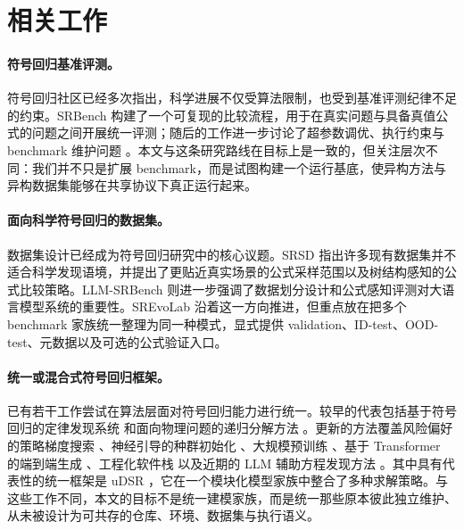 \documentclass[UTF8]{ctexart}
\begin{document}
\section{相关工作}

\paragraph{符号回归基准评测。}
符号回归社区已经多次指出，科学进展不仅受算法限制，也受到基准评测纪律不足的约束。SRBench \citep{lacava2021srbench} 构建了一个可复现的比较流程，用于在真实问题与具备真值公式的问题之间开展统一评测；随后的工作进一步讨论了超参数调优、执行约束与 benchmark 维护问题 \citep{aldeia2025call}。本文与这条研究路线在目标上是一致的，但关注层次不同：我们并不只是扩展 benchmark，而是试图构建一个运行基底，使异构方法与异构数据集能够在共享协议下真正运行起来。

\paragraph{面向科学符号回归的数据集。}
数据集设计已经成为符号回归研究中的核心议题。SRSD \citep{matsubara2022rethinking} 指出许多现有数据集并不适合科学发现语境，并提出了更贴近真实场景的公式采样范围以及树结构感知的公式比较策略。LLM-SRBench \citep{shojaee2025llmsrbench} 则进一步强调了数据划分设计和公式感知评测对大语言模型系统的重要性。SREvoLab 沿着这一方向推进，但重点放在把多个 benchmark 家族统一整理为同一种模式，显式提供 validation、ID-test、OOD-test、元数据以及可选的公式验证入口。

\paragraph{统一或混合式符号回归框架。}
已有若干工作尝试在算法层面对符号回归能力进行统一。较早的代表包括基于符号回归的定律发现系统 \citep{schmidt2009distilling} 和面向物理问题的递归分解方法 \citep{udrescu2020aifeynman,udrescu2020aifeynman2}。更新的方法覆盖风险偏好的策略梯度搜索 \citep{petersen2021deep}、神经引导的种群初始化 \citep{mundhenk2021seeding}、大规模预训练 \citep{biggio2021nsr}、基于 Transformer 的端到端生成 \citep{valipour2021symbolicgpt,kamienny2022end,vastl2022symformer,tpsr2023}、工程化软件栈 \citep{cranmer2023pysr} 以及近期的 LLM 辅助方程发现方法 \citep{shojaee2024llm,wang2025drsr}。其中具有代表性的统一框架是 uDSR \citep{landajuela2022udsr}，它在一个模块化模型家族中整合了多种求解策略。与这些工作不同，本文的目标不是统一建模家族，而是统一那些原本彼此独立维护、从未被设计为可共存的仓库、环境、数据集与执行语义。
\end{document}
